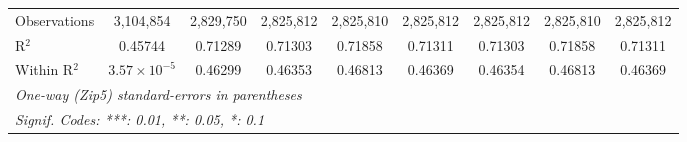 \begin{table}[H]
{\begin{tabular}{lcccccccc}
 Observations & 3,104,854&2,829,750&2,825,812&2,825,810&2,825,812&2,825,812&2,825,810&2,825,812\\ 

 R$^2$ & 0.45744&0.71289&0.71303&0.71858&0.71311&0.71303&0.71858&0.71311\\ 

 Within R$^2$ & $3.57\times 10^{-5}$&0.46299&0.46353&0.46813&0.46369&0.46354&0.46813&0.46369\\ 

 \midrule\midrule\multicolumn{9}{l}{\emph{One-way (Zip5) standard-errors in parentheses}}\\ 

 \multicolumn{9}{l}{\emph{Signif. Codes: ***: 0.01, **: 0.05, *: 0.1}}\\ 

 \end{tabular}} 

 \end{table} 

  

